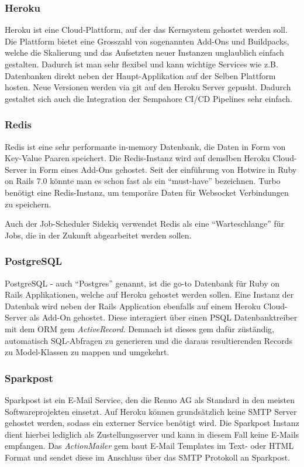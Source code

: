 \subsubsection{Heroku}
Heroku ist eine Cloud-Plattform, auf der das Kernsystem gehostet werden soll. Die Plattform bietet eine
Grosszahl von sogenannten Add-Ons und Buildpacks, welche die Skalierung und das Aufsetzten neuer Instanzen unglaublich einfach gestalten.
Dadurch ist man sehr flexibel und kann wichtige Services wie z.B. Datenbanken direkt neben der Haupt-Applikation auf der Selben Plattform hosten.
Neue Versionen werden via git auf den Heroku Server gepusht. Dadurch gestaltet sich auch die Integration der Sempahore CI/CD Pipelines sehr einfach.

\subsubsection{Redis}
Redis ist eine sehr performante in-memory Datenbank, die Daten in Form von Key-Value Paaren speichert.
Die Redis-Instanz wird auf demslben Heroku Cloud-Server in Form eines Add-Ons gehostet. Seit der einführung
von Hotwire in Ruby on Rails 7.0 könnte man es schon fast als ein \enquote{must-have} bezeichnen.
Turbo benötigt eine Redis-Instanz, um temporäre Daten für Websocket Verbindungen zu speichern.

Auch der Job-Scheduler Sidekiq verwendet Redis als eine \enquote{Warteschlange} für Jobs, die in der Zukunft
abgearbeitet werden sollen.

\subsubsection{PostgreSQL}
PostgreSQL - auch \enquote{Postgres} genannt, ist die go-to Datenbank für Ruby on Rails Applikationen,
welche auf Heroku gehostet werden sollen. Eine Instanz der Datenbak wird neben der Rails Application ebenfalls auf einem
Heroku Cloud-Server als Add-On gehostet. Diese interagiert über einen PSQL Datenbanktreiber mit dem ORM \gls{gem} \emph{ActiveRecord}.
Demnach ist dieses gem dafür züständig, automatisch SQL-Abfragen zu generieren und die daraus resultierenden Records zu Model-Klassen zu mappen und umgekehrt.

\subsubsection{Sparkpost}
Sparkpost ist ein E-Mail Service, den die Renuo AG als Standard in den meisten Softwareprojekten einsetzt.
Auf Heroku können grundsätzlich keine SMTP Server gehostet werden, sodass ein externer Service benötigt wird. Die Sparkpost Instanz
dient hierbei lediglich als Zustellungsserver und kann in diesem Fall keine E-Mails empfangen. Das \emph{ActionMailer} gem baut
E-Mail Templates im Text- oder HTML Format und sendet diese im Anschluss über das SMTP Protokoll an Sparkpost.

